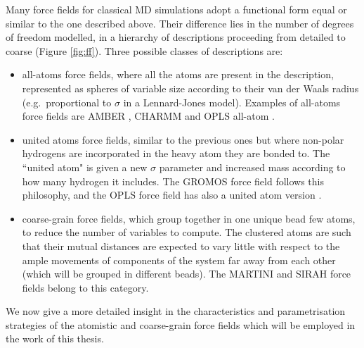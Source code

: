 Many force fields for classical MD simulations adopt a functional form equal or similar to the one described above. Their difference lies in the number of degrees of freedom modelled, in a hierarchy of descriptions proceeding from detailed to coarse (Figure \ref{fig:ff}). Three possible classes of descriptions are:
\begin{itemize}
\item all-atoms force fields, where all the atoms are present in the description, represented as spheres of variable size according to their van der Waals radius (e.g.\ proportional to $\sigma$ in a Lennard-Jones model). Examples of all-atoms force fields are AMBER \citep{Maier2015,Dickson2014,Wang2004_amber}, CHARMM \citep{MacKerell1998,Klauda2010,Huang2013} and OPLS all-atom \citep{Jorgensen1988}.
\item united atoms force fields, similar to the previous ones but where non-polar hydrogens are incorporated in the heavy atom they are bonded to. The ``united atom" is given a new $\sigma$ parameter and increased mass according to how many hydrogen it includes. The GROMOS force field \citep{Oostenbrink2004,Schmid2011} follows this philosophy, and the OPLS force field has also a united atom version \citep{Jorgensen1996}.
\item coarse-grain force fields, which group together in one unique bead few atoms, to reduce the number of variables to compute. The clustered atoms are such that their mutual distances are expected to vary little with respect to the ample movements of components of the system far away from each other (which will be grouped in different beads). The MARTINI \citep{Marrink2007,Monticelli2008,DeJong2013} and SIRAH \citep{Machado2018,Barrera2019} force fields belong to this category.
\end{itemize}
%
We now give a more detailed insight in the characteristics and parametrisation strategies of the atomistic and coarse-grain force fields which will be employed in the work of this thesis.

